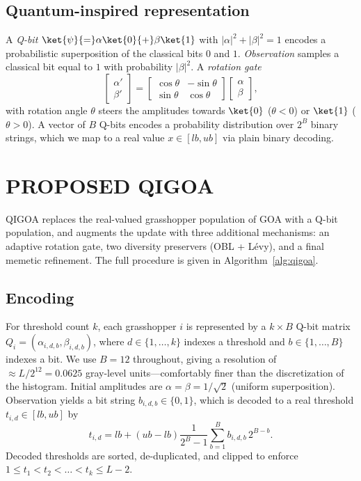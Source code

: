 \subsection{Quantum-inspired representation}

A \emph{Q-bit} $\ket{\psi}{=}\alpha\ket{0}{+}\beta\ket{1}$ with $|\alpha|^2{+}|\beta|^2{=}1$ encodes a probabilistic superposition of the classical bits $0$ and $1$. \emph{Observation} samples a classical bit equal to $1$ with probability $|\beta|^2$. A \emph{rotation gate}
\begin{equation}\label{eq:rotation}
\begin{bmatrix}\alpha'\\\beta'\end{bmatrix} = \begin{bmatrix}\cos\theta & -\sin\theta\\\sin\theta & \cos\theta\end{bmatrix}\begin{bmatrix}\alpha\\\beta\end{bmatrix},
\end{equation}
with rotation angle $\theta$ steers the amplitudes towards $\ket{0}$ ($\theta{<}0$) or $\ket{1}$ ($\theta{>}0$). A vector of $B$ Q-bits encodes a probability distribution over $2^B$ binary strings, which we map to a real value $x\in[lb,ub]$ via plain binary decoding.

\section{PROPOSED QIGOA}\label{sec:qigoa}

QIGOA replaces the real-valued grasshopper population of GOA with a Q-bit population, and augments the update with three additional mechanisms: an adaptive rotation gate, two diversity preservers (OBL + L\'evy), and a final memetic refinement. The full procedure is given in Algorithm~\ref{alg:qigoa}.

\subsection{Encoding}

For threshold count $k$, each grasshopper $i$ is represented by a $k{\times}B$ Q-bit matrix $Q_i{=}(\alpha_{i,d,b},\beta_{i,d,b})$, where $d{\in}\{1,\dots,k\}$ indexes a threshold and $b{\in}\{1,\dots,B\}$ indexes a bit. We use $B{=}12$ throughout, giving a resolution of $\approx{}L/2^{12}{=}0.0625$ gray-level units---comfortably finer than the discretization of the histogram. Initial amplitudes are $\alpha{=}\beta{=}1/\sqrt{2}$ (uniform superposition). Observation yields a bit string $b_{i,d,b}{\in}\{0,1\}$, which is decoded to a real threshold $t_{i,d}{\in}[lb,ub]$ by
\begin{equation}\label{eq:decode}
t_{i,d} = lb + (ub-lb)\frac{1}{2^B-1}\sum_{b=1}^{B} b_{i,d,b} \, 2^{B-b}.
\end{equation}
Decoded thresholds are sorted, de-duplicated, and clipped to enforce $1{\le}t_1{<}t_2{<}\dots{<}t_k{\le}L{-}2$.

